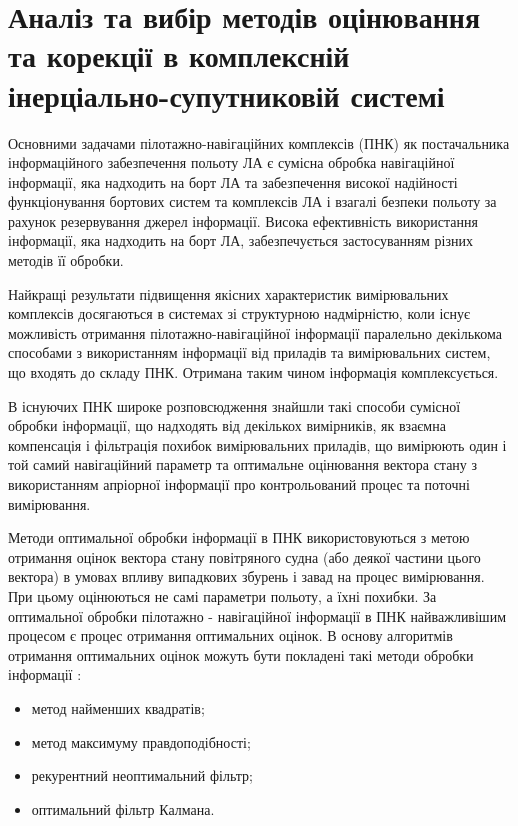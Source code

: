 \section{Аналіз та вибір методів оцінювання та корекції в комплексній інерціально-супутниковій системі}

Основними задачами пілотажно-навігаційних комплексів (ПНК) як постачальника 
інформаційного забезпечення польоту ЛА є сумісна обробка навігаційної інформації, 
яка надходить на борт ЛА та забезпечення високої надійності функціонування бортових 
систем та комплексів ЛА і взагалі безпеки польоту за рахунок резервування 
джерел інформації. Висока ефективність використання інформації, яка 
надходить на борт ЛА, забезпечується застосуванням різних методів її обробки. 

Найкращі результати підвищення якісних характеристик вимірювальних комплексів 
досягаються  в системах зі структурною надмірністю, коли існує можливість 
отримання пілотажно-навігаційної інформації паралельно декількома способами з 
використанням інформації від приладів та вимірювальних систем, що входять до 
складу ПНК. Отримана таким чином інформація комплексується.

В існуючих ПНК широке розповсюдження знайшли такі способи сумісної обробки 
інформації, що надходять від декількох вимірників, як взаємна компенсація і 
фільтрація похибок вимірювальних приладів, що вимірюють один і той самий 
навігаційний параметр та оптимальне оцінювання вектора стану з використанням 
апріорної інформації про контрольований процес та поточні вимірювання.

Методи оптимальної обробки інформації в ПНК використовуються з метою 
отримання оцінок вектора стану повітряного судна (або деякої частини 
цього вектора) в умовах впливу випадкових збурень і завад на процес 
вимірювання. При цьому оцінюються не самі параметри польоту, а їхні похибки. 
За оптимальної обробки пілотажно - навігаційної інформації в ПНК найважливішим 
процесом є процес отримання оптимальних оцінок. В основу алгоритмів отримання 
оптимальних оцінок можуть бути покладені такі методи обробки інформації \cite{bib:pnk}:
\begin{itemize}
 \item метод найменших квадратів;
 \item метод максимуму правдоподібності;
 \item рекурентний неоптимальний фільтр;
 \item оптимальний фільтр Калмана.
\end{itemize}

